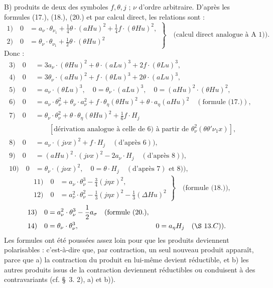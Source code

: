 \documentclass[11pt]{article}
\newcommand{\D}{\Delta}
\begin{document}
B) produits de deux des symboles $f,\theta,j$ ; $\nu$ d'ordre arbitraire. D'après les formules (17.), (18.), (20.) et par calcul direct, les relations sont :
\[
\left.
\begin{aligned}
1)\quad 0&=a_\nu\cdot\theta_{\nu_1}+\frac14\theta\cdot(aHu)^2+\frac14f\cdot(\theta Hu)^2,\\
2)\quad 0&=\theta_\nu\cdot\theta_{\nu_1}+\frac12\theta\cdot(\theta Hu)^2
\end{aligned}
\right\}\quad\text{(calcul direct analogue à A 1)).}
\]
Donc :
\begin{align*}
3)\quad 0&=3a_\nu\cdot(\theta Hu)^2+\theta\cdot(aLu)^3+2f\cdot(\theta Lu)^3,\\
4)\quad 0&=3\theta_\nu\cdot(aHu)^2+f\cdot(\theta Lu)^3+2\theta\cdot(aLu)^3,\\
5)\quad 0&=a_\nu\cdot(\theta Lu)^3,\quad 0=\theta_\nu\cdot(aLu)^3,\quad 0=(aHu)^2\cdot(\theta Hu)^2,\\
6)\quad 0&=a_\nu\cdot\theta_\nu^2+\theta_\nu\cdot a_\nu^2+f\cdot\theta_\eta(\theta Hu)^2+\theta\cdot a_\eta(aHu)^2\quad(\text{formule (17.)}),\\
7)\quad 0&=\theta_\nu\cdot\theta_\nu^2+\theta\cdot\theta_\eta(\theta Hu)^2+\frac16f\cdot H_j\\
&\qquad [\text{dérivation analogue à celle de }6)\text{ à partir de }\theta_\nu^2(\theta\theta'\nu_1x)],\\
8)\quad 0&=a_\nu\cdot(j\nu x)^2+f\cdot H_j\quad(\text{d'après }6)),\\
9)\quad 0&=(aHu)^2\cdot(j\nu x)^2-2a_\nu\cdot H_j\quad(\text{d'après }8)),\\
10)\quad 0&=\theta_\nu\cdot(j\nu x)^2,\quad 0=\theta\cdot H_j\quad(\text{d'après }7)\text{ et }8)),
\end{align*}
\[
\left.
\begin{aligned}
11)\quad 0&=a_\nu\cdot\theta_\nu^3-\frac34(j\eta x)^2,\\
12)\quad 0&=a_\nu^2\cdot\theta_\nu^2-\frac13(j\eta x)^2-\frac13(\D Hu)^2
\end{aligned}
\right\}\quad\text{(formule (18.)),}
\]
\begin{align*}
13)\quad 0&=a_\nu^2\cdot\theta_\nu^3-\frac12a_\sigma\quad(\text{formule (20.}),\\
14)\quad 0&=\theta_\nu\cdot\theta_\nu^3,
&0&=a_\eta H_j\quad(\S\ 13. C)).
\end{align*}
Les formules ont été poussées assez loin pour que les produits deviennent polarisables : c'est-à-dire que, par contraction, un seul nouveau produit apparaît, parce que a) la contraction du produit en lui-même devient réductible, et b) les autres produits issus de la contraction deviennent réductibles ou conduisent à des contravariants (cf. \S\ 3. 2), a) et b)).
\end{document}
